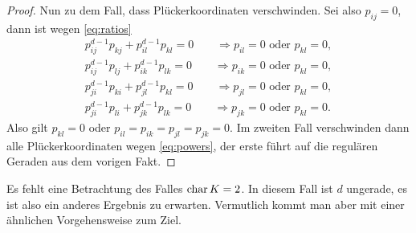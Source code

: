 \begin{proof}
Nun zu dem Fall, dass Plückerkoordinaten verschwinden. Sei also $p_{ij}=0$, dann ist wegen \eqref{eq:ratios}
\begin{align*}
p_{ij}^{d-1}p_{kj} + p_{il}^{d-1}p_{kl} = 0 \qquad\Rightarrow p_{il} = 0 \text{ oder } p_{kl} = 0, \\
p_{ij}^{d-1}p_{lj} + p_{ik}^{d-1}p_{lk} = 0 \qquad\Rightarrow p_{ik} = 0 \text{ oder } p_{kl} = 0, \\
p_{ji}^{d-1}p_{ki} + p_{jl}^{d-1}p_{kl} = 0 \qquad\Rightarrow p_{jl} = 0 \text{ oder } p_{kl} = 0, \\
p_{ji}^{d-1}p_{li} + p_{jk}^{d-1}p_{lk} = 0 \qquad\Rightarrow p_{jk} = 0 \text{ oder } p_{kl} = 0.
\end{align*}
Also gilt $p_{kl} = 0$ oder $p_{il} = p_{ik} = p_{jl} = p_{jk} = 0$. Im zweiten Fall verschwinden dann alle Plückerkoordinaten wegen \eqref{eq:powers}, der erste führt auf die regulären Geraden aus dem vorigen Fakt.
\end{proof}
\begin{remarks}
Es fehlt eine Betrachtung des Falles $\operatorname{char} K = 2$. In diesem Fall ist $d$ ungerade, es ist also ein anderes Ergebnis zu erwarten. Vermutlich kommt man aber mit einer ähnlichen Vorgehensweise zum Ziel.
\end{remarks}

